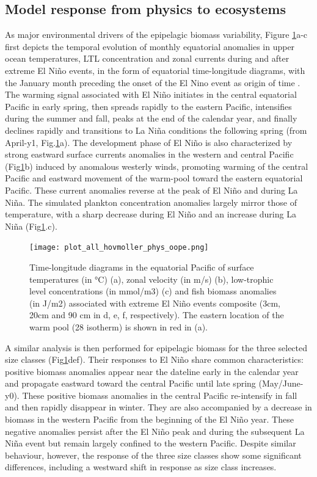 \subsection{Model response from physics to ecosystems}

As major environmental drivers of the epipelagic biomass variability, Figure \ref{fig:hov_nemo_ape}a-c first depicts the temporal evolution of monthly equatorial anomalies in upper ocean temperatures, LTL concentration and zonal currents during and after extreme El Niño events, in the form of equatorial time-longitude diagrams, with the January month preceding the onset of the El Nino event as origin of time . The warming signal associated with El Niño initiates in the central equatorial Pacific in early spring, then spreads rapidly to the eastern Pacific, intensifies during the summer and fall, peaks at the end of the calendar year, and finally  declines rapidly and transitions to La Niña conditions the following spring (from April-y1, Fig.\ref{fig:hov_nemo_ape}a). The development phase of El Niño is also characterized by strong eastward surface currents anomalies in the western and central Pacific (Fig\ref{fig:hov_nemo_ape}b) induced by anomalous westerly winds, promoting warming of the central Pacific and eastward movement of the warm-pool toward the eastern equatorial Pacific. These current anomalies reverse at the peak of El Niño and during La Niña. The simulated plankton concentration anomalies largely mirror those of temperature, with a sharp decrease during El Niño and an increase during La Niña (Fig\ref{fig:hov_nemo_ape}.c). 

\begin{figure}[h!tp]
	\centering
	\texttt{[image: plot\_all\_hovmoller\_phys\_oope.png]}	
	\caption{Time-longitude diagrams in the equatorial Pacific of surface temperatures (in °C) (a), zonal velocity (in m/s) (b), low-trophic level concentrations (in mmol/m3) (c) and fish biomass anomalies (in J/m2) associated with extreme El Niño events composite (3cm, 20cm and 90 cm in d, e, f, respectively). The eastern location of the warm pool (28\degree{} isotherm) is shown in red in (a).}	
	\label{fig:hov_nemo_ape}
\end{figure}

A similar analysis is then performed for epipelagic biomass for the three selected size classes (Fig\ref{fig:hov_nemo_ape}def). Their responses to El Niño share common characteristics: positive biomass anomalies appear near the dateline early in the calendar year and propagate eastward toward the central Pacific until late spring (May/June-y0). These positive biomass anomalies in the central Pacific re-intensify in fall and then rapidly disappear in winter. They are also accompanied by a decrease in biomass in the western Pacific from the beginning of the El Niño year. These negative anomalies persist after the El Niño peak and during the subsequent La Niña event but remain largely confined to the western Pacific. Despite similar behaviour, however, the response of the three size classes show some significant differences, including a westward shift in response as size class increases.

